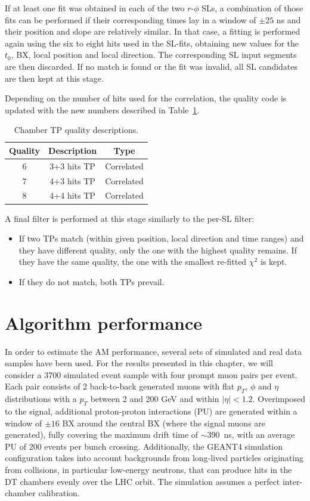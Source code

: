 \documentclass[../main.tex]{subfiles}
\begin{document}
If at least one fit was obtained in each of the two $r$-$\phi$ SLs, a combination of those fits can be performed if their corresponding times lay in a window of $\pm 25$ ns and their position and slope are relatively similar. In that case, a fitting is performed again using the six to eight hits used in the SL-fits, obtaining new values for the $t_0$, BX, local position and local direction. The corresponding SL input segments are then discarded. If no match is found or the fit was invalid, all SL candidates are then kept at this stage. 

Depending on the number of hits used for the correlation, the quality code is updated with the new numbers described in Table~\ref{dts:tab:quality_cor}.


\begin{table}[h!]
	\centering
	\begin{tabular}{c|c|c}
		Quality & Description & Type \\\hline
		6 & 3+3 hits TP & Correlated \\
		7 & 4+3 hits TP & Correlated \\
		8 & 4+4 hits TP & Correlated
	\end{tabular}
	\caption[Chamber trigger primitives' quality descriptions]{Chamber TP quality descriptions.}
	\label{dts:tab:quality_cor}
\end{table}

A final filter is performed at this stage similarly to the per-SL filter:
\begin{itemize}
\item If two TPs match (within given position, local direction and time ranges) and they have different quality, only the one with the highest quality remains. If they have the same quality, the one with the smallest re-fitted $\chi^2$ is kept.
\item If they do not match, both TPs prevail.
\end{itemize}


\section{Algorithm performance}
\label{dts:sec:performance}

In order to estimate the AM performance, several sets of simulated and real data samples have been used. For the results presented in this chapter, we will consider a 3700 simulated event sample with four prompt muon pairs per event. Each pair consists of 2 back-to-back generated muons with flat $p_T$, $\phi$  and $\eta$ distributions with a $p_T$ between 2 and 200 GeV and within $|\eta|<1.2$. Overimposed to the signal, additional proton-proton interactions (PU) are generated within a window of $\pm16$ BX around the central BX (where the signal muons are generated), fully covering the maximum drift time of $\sim$390~ns, with an average PU of 200 events per bunch crossing. Additionally, the GEANT4 simulation configuration takes into account backgrounds from long-lived particles originating from collisions, in particular low-energy neutrons, that can produce hits in the DT chambers evenly over the LHC orbit. The simulation assumes a perfect inter-chamber calibration.
\end{document}
